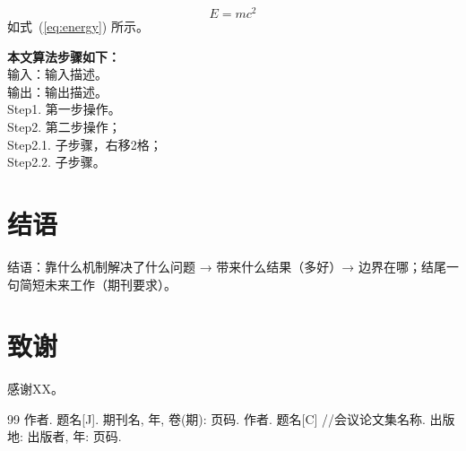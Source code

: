 \documentclass[twocolumn,10pt]{ctexart}
\begin{document}
\begin{equation}
  E = m c^2 \label{eq:energy}
\end{equation}
如式~(\ref{eq:energy}) 所示。

\textbf{本文算法步骤如下：}\\
输入：{输入描述}。\\
输出：{输出描述}。\\
Step1. {第一步操作}。\\
Step2. {第二步操作}；\\
\hspace{2em} Step2.1. {子步骤，右移2格}；\\
\hspace{2em} Step2.2. {子步骤}。

\section{结\quad 语}
{结语：靠什么机制解决了什么问题 → 带来什么结果（多好）→ 边界在哪；结尾一句简短未来工作（期刊要求）。}

\section*{致\quad 谢}
{感谢{XX}。}

\begin{thebibliography}{99}
\fontsize{8}{10}\selectfont
{} {作者}. {题名}[J]. {期刊名}, {年}, {卷}({期}): {页码}.
 {作者}. {题名}[C] //{会议论文集名称}. {出版地}: {出版者}, {年}: {页码}.
\end{thebibliography}

\end{document}

